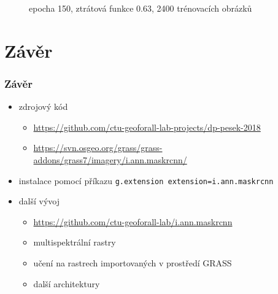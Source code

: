 \documentclass{beamer}
\begin{document}
\begin{frame}
\begin{figure}[ht]
{	\caption{epocha 150, ztrátová funkce 0.63, 2400 trénovacích obrázků}}
\end{figure}

\end{frame}


\section{Závěr}

\begin{frame}[fragile]

\frametitle{Závěr}

\begin{itemize}
	\item zdrojový kód
	\begin{itemize}
		\item \url{https://github.com/ctu-geoforall-lab-projects/dp-pesek-2018}
		\item \url{https://svn.osgeo.org/grass/grass-addons/grass7/imagery/i.ann.maskrcnn/}
	\end{itemize}
	\item instalace pomocí příkazu \verb|g.extension extension=i.ann.maskrcnn|
	\item další vývoj
	\begin{itemize}
		\item \url{https://github.com/ctu-geoforall-lab/i.ann.maskrcnn}
		\item multispektrální rastry
		\item učení na rastrech importovaných v prostředí GRASS
		\item další architektury
	\end{itemize}
\end{itemize}

\end{frame}
\end{document}
